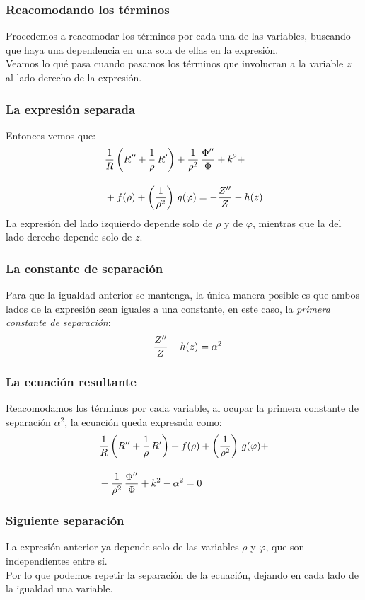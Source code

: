 \documentclass[12pt]{beamer}
\begin{document}
\begin{frame}
\frametitle{Reacomodando los términos}
Procedemos a reacomodar los términos por cada una de las variables, buscando que haya una dependencia en una sola de ellas en la expresión.
\\
\bigskip
\pause
Veamos lo qué pasa cuando pasamos los términos que involucran a la variable $z$ al lado derecho de la expresión.
\end{frame}
\begin{frame}
\frametitle{La expresión separada}
Entonces vemos que:
\pause
\begin{align*}
&{} \dfrac{1}{R} \left( {R}^{\prime \prime} + \dfrac{1}{\rho} \, {R}^{\prime} \right) + \dfrac{1}{\rho^{2}} \, \dfrac{{\Phi}^{\prime \prime}}{\Phi} + k^{2} + \\[1em]
&+ f(\rho) + \left( \dfrac{1}{\rho^{2}} \right) \, g(\varphi) = - \dfrac{{Z}^{\prime \prime}}{Z} - h(z)
\end{align*}
\pause
La expresión del lado izquierdo depende solo de $\rho$ y de $\varphi$, mientras que la del lado derecho depende solo de $z$.
\end{frame}
\begin{frame}
\frametitle{La constante de separación}
Para que la igualdad anterior se mantenga, la única manera posible es que ambos lados de la expresión sean iguales a una constante, en este caso, la \emph{primera constante de separación}:
\pause
\begin{align*}
- \dfrac{{Z}^{\prime \prime}}{Z} - h(z) = \alpha^{2}
\end{align*}
\end{frame}
\begin{frame}
\frametitle{La ecuación resultante}
Reacomodamos los términos por cada variable, al ocupar la primera constante de separación $\alpha^{2}$, la ecuación queda expresada como:
\pause
\begin{align*}
&{} \dfrac{1}{R} \left( {R}^{\prime \prime} + \dfrac{1}{\rho} \, {R}^{\prime} \right) +  f(\rho) + \left( \dfrac{1}{\rho^{2}} \right) \, g(\varphi) + \\[1em]
&+ \dfrac{1}{\rho^{2}} \, \dfrac{{\Phi}^{\prime \prime}}{\Phi} + k^{2} - \alpha^{2} = 0
\end{align*}
\end{frame}
\begin{frame}
\frametitle{Siguiente separación}
La expresión anterior ya depende solo de las variables $\rho$ y $\varphi$, que son independientes entre sí.
\\
\bigskip
\pause
Por lo que podemos repetir la separación de la ecuación, dejando en cada lado de la igualdad una variable.
\end{frame}
\end{document}
